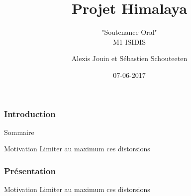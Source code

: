 \documentclass{beamer}
\begin{document}
	\title{Projet Himalaya}
	\subtitle{"Soutenance Oral"\\
		M1 ISIDIS}
	\author {Alexis Jouin et Sébastien Schouteeten}
	\date{07-06-2017}
	\frame[plain]{
		\titlepage
	}

	\begin{frame}
		\frametitle{Introduction}
		\begin{block}{Sommaire}
			\tableofcontents
		\end{block}
		\begin{block}{Motivation}
			Limiter au maximum ces distorsions
		\end{block}
	\end{frame}

	\begin{frame}
		\frametitle{Présentation}
		\begin{block}{Motivation}
			Limiter au maximum ces distorsions
		\end{block}	
	\end{frame}

	
\end{document}
